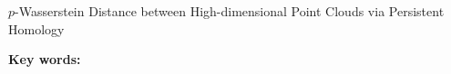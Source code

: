 \documentclass[
hidelinks,
12pt, %
oneside, %
english, %
doublespacing, %
headsepline, %
]{MastersDoctoralThesis} %
\author{\textsc{Zhang} Liu} %
\begin{document}
\frontmatter 
\pagestyle{plain} 

% 





\begin{titlepage}\centering
\vspace*{\fill}
{\LARGE{$p$-Wasserstein Distance between High-dimensional Point Clouds via Persistent Homology}}

\vspace*{\fill}
\textbf{Key words:} \keywordnames
\end{titlepage}



\end{document}
